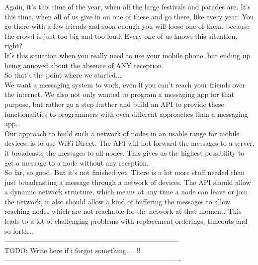 Again, it's this time of the year, when all the large festivals and parades are. It's this time, when all of us give in on one of these and go there, like every year. 
You go there with a few friends and soon enough you will loose one of them, because the crowd is just too big and too loud. Every one of us knows this situation, right? \\
It's this situation when you really need to use your mobile phone, but ending up being annoyed about the absence of ANY reception. \\
So that's the point where we started... \\

We want a messaging system to work, even if you can't reach your friends over the internet. We also not only wanted to program a messaging app for that purpose, but rather go a step further and build an API to provide these functionalities to programmers with even different approaches than a messaging app. \\

Our approach to build such a network of nodes in an usable range for mobile devices, is to use WiFi Direct. The API will not forward the messages to a server, it broadcasts the messages to all nodes. This gives us the highest possibility to get a message to a node without any reception. \\

So far, so good. But it's not finished yet. There is a lot more stuff needed than just broadcasting a message through a network of devices. The API should allow a dynamic network structure, which means at any time a node can leave or join the network, it also should allow a kind of buffering the messages to allow reaching nodes which are not reachable for the network at that moment. This leads to a lot of challenging problems with replacement orderings, timeouts and so forth... \\

---------------------------------------------------------------------------\\
TODO: Write here if i forgot something.... !! \\

----------------------------------------------------------------------------